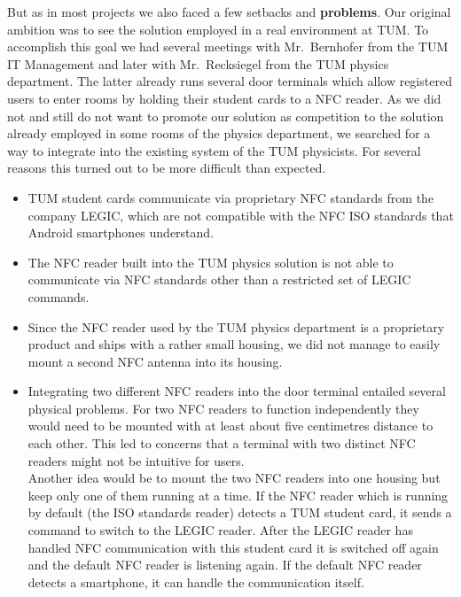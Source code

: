 But as in most projects we also faced a few setbacks and \textbf{problems}.
Our original ambition was to see the \app solution employed in a real environment at TUM.
To accomplish this goal we had several meetings with Mr.~Bernhofer from the TUM IT Management and later with Mr.~Recksiegel from the TUM physics department.
The latter already runs several door terminals which allow registered users to enter rooms by holding their student cards to a NFC reader.
As we did not and still do not want to promote our solution as competition to the solution already employed in some rooms of the physics department, we searched for a way to integrate \app into the existing system of the TUM physicists.
For several reasons this turned out to be more difficult than expected.
\begin{itemize}
\item TUM student cards communicate via proprietary NFC standards from the company LEGIC, which are not compatible with the NFC ISO standards that Android smartphones understand.
\item The NFC reader built into the TUM physics solution is not able to communicate via NFC standards other than a restricted set of LEGIC commands.
\item Since the NFC reader used by the TUM physics department is a proprietary product and ships with a rather small housing, we did not manage to easily mount a second NFC antenna into its housing.
\item Integrating two different NFC readers into the door terminal entailed several physical problems.
For two NFC readers to function independently they would need to be mounted with at least about five centimetres distance to each other.
This led to concerns that a terminal with two distinct NFC readers might not be intuitive for users.\\
Another idea would be to mount the two NFC readers into one housing but keep only one of them running at a time.
If the NFC reader which is running by default (the ISO standards reader) detects a TUM student card, it sends a command to switch to the LEGIC reader.
After the LEGIC reader has handled NFC communication with this student card it is switched off again and the default NFC reader is listening again.
If the default NFC reader detects a smartphone, it can handle the communication itself.
\end{itemize}


